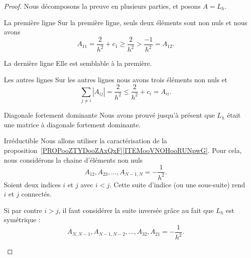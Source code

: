 \begin{proof}
	Nous décomposons la preuve en plusieurs parties, et posons \( A=L_h\).
	\begin{subproof}
		\item[La première ligne]
		Sur la première ligne, seuls deux éléments sont non nuls et nous avons
		\begin{equation}
			A_{11}=\frac{ 2 }{ h^2 }+c_1\geq \frac{ 2 }{ h^2 }>\frac{-1}{ h^2 }=A_{12}.
		\end{equation}

		\item[La dernière ligne]
		Elle est semblable à la première.

		\item[Les autres lignes]
		Sur les autres lignes nous avons trois éléments non nuls et
		\begin{equation}
			\sum_{j\neq i}| A_{ij} |=\frac{ 2 }{ h^2 }\leq \frac{ 2 }{ h^2 }+c_i=A_{ii}.
		\end{equation}

		\item[Diagonale fortement dominante]
		Nous avons prouvé jusqu'à présent que \( L_h\) était une matrice à diagonale fortement dominante.

		\item[Irréductible]
		Nous allons utiliser la caractérisation de la proposition~\ref{PROPooZTYDooZAxQxF}\ref{ITEMooVNOHooRUNpwG}. Pour cela, nous considérons la chaine d'éléments non nuls
		\begin{equation}
			A_{12}, A_{23},\ldots, A_{N-1,N}=-\frac{1}{ h^2 }.
		\end{equation}
		Soient deux indices \( i\) et \( j\) avec \( i<j\). Cette suite d'indice (ou une sous-suite) rend \( i\) et \( j\) connectés.

		Si par contre \( i>j\), il faut considérer la suite inversée grâce au fait que \( L_h\) est symétrique :
		\begin{equation}
			A_{N,N-1},A_{N-1,N-2},\ldots, A_{32}, A_{21}=-\frac{ 1 }{ h^2 }.
		\end{equation}
	\end{subproof}
\end{proof}

